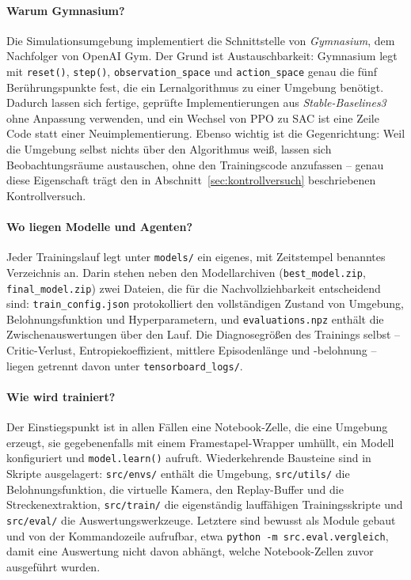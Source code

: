 \paragraph{Warum Gymnasium?}
Die Simulationsumgebung implementiert die Schnittstelle von \emph{Gymnasium}, dem Nachfolger von OpenAI Gym. Der Grund ist Austauschbarkeit: Gymnasium legt mit \texttt{reset()}, \texttt{step()}, \texttt{observation\_space} und \texttt{action\_space} genau die fünf Berührungspunkte fest, die ein Lernalgorithmus zu einer Umgebung benötigt. Dadurch lassen sich fertige, geprüfte Implementierungen aus \emph{Stable-Baselines3} \cite{raffin2021stable} ohne Anpassung verwenden, und ein Wechsel von \ac{PPO} zu \ac{SAC} ist eine Zeile Code statt einer Neuimplementierung. Ebenso wichtig ist die Gegenrichtung: Weil die Umgebung selbst nichts über den Algorithmus weiß, lassen sich Beobachtungsräume austauschen, ohne den Trainingscode anzufassen -- genau diese Eigenschaft trägt den in Abschnitt~\ref{sec:kontrollversuch} beschriebenen Kontrollversuch.

\paragraph{Wo liegen Modelle und Agenten?}
Jeder Trainingslauf legt unter \texttt{models/} ein eigenes, mit Zeitstempel benanntes Verzeichnis an. Darin stehen neben den Modellarchiven (\texttt{best\_model.zip}, \texttt{final\_model.zip}) zwei Dateien, die für die Nachvollziehbarkeit entscheidend sind: \texttt{train\_config.json} protokolliert den vollständigen Zustand von Umgebung, Belohnungsfunktion und Hyperparametern, und \texttt{evaluations.npz} enthält die Zwischenauswertungen über den Lauf. Die Diagnosegrößen des Trainings selbst -- Critic-Verlust, Entropiekoeffizient, mittlere Episodenlänge und -belohnung -- liegen getrennt davon unter \texttt{tensorboard\_logs/}.

\paragraph{Wie wird trainiert?}
Der Einstiegspunkt ist in allen Fällen eine Notebook-Zelle, die eine Umgebung erzeugt, sie gegebenenfalls mit einem Framestapel-Wrapper umhüllt, ein Modell konfiguriert und \texttt{model.learn()} aufruft. Wiederkehrende Bausteine sind in Skripte ausgelagert: \texttt{src/envs/} enthält die Umgebung, \texttt{src/utils/} die Belohnungsfunktion, die virtuelle Kamera, den Replay-Buffer und die Streckenextraktion, \texttt{src/train/} die eigenständig lauffähigen Trainingsskripte und \texttt{src/eval/} die Auswertungswerkzeuge. Letztere sind bewusst als Module gebaut und von der Kommandozeile aufrufbar, etwa \texttt{python -m src.eval.vergleich}, damit eine Auswertung nicht davon abhängt, welche Notebook-Zellen zuvor ausgeführt wurden.


